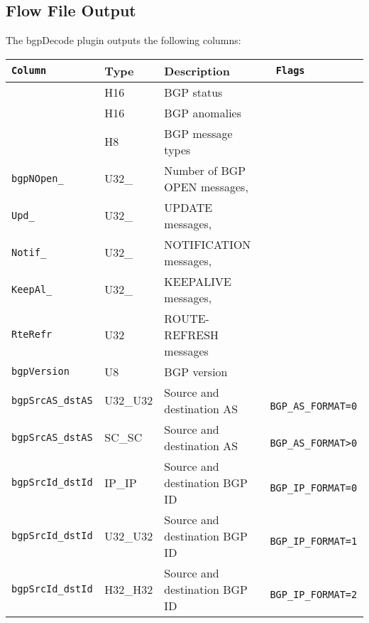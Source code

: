 \documentclass[documentation]{subfiles}
\begin{document}
\subsection{Flow File Output}
The bgpDecode plugin outputs the following columns:
\begin{longtable}{>{\tt}lll>{\tt\small}l}
    \toprule
    {\bf Column}                        & {\bf Type}   & {\bf Description}                             & {\bf Flags}\\
    \midrule\endhead%
    \nameref{bgpStat}                   & H16          & BGP status                                    & \\
    \nameref{bgpAFlgs}                  & H16          & BGP anomalies                                 & \\
    \nameref{bgpMsgT}                   & H8           & BGP message types                             & \\
    bgpNOpen\_                          & U32\_        & Number of BGP OPEN messages,                  & \\
    \qquad Upd\_                        & \qquad U32\_ & \qquad UPDATE messages,                       & \\
    \qquad Notif\_                      & \qquad U32\_ & \qquad NOTIFICATION messages,                 & \\
    \qquad KeepAl\_                     & \qquad U32\_ & \qquad KEEPALIVE messages,                    & \\
    \qquad RteRefr                      & \qquad U32   & \qquad ROUTE-REFRESH messages                 & \\
    bgpVersion                          & U8           & BGP version\\
    bgpSrcAS\_dstAS                     & U32\_U32     & Source and destination AS                     & BGP\_AS\_FORMAT=0\\
    bgpSrcAS\_dstAS                     & SC\_SC       & Source and destination AS                     & BGP\_AS\_FORMAT>0\\
    bgpSrcId\_dstId                     & IP\_IP       & Source and destination BGP ID                 & BGP\_IP\_FORMAT=0\\
    bgpSrcId\_dstId                     & U32\_U32     & Source and destination BGP ID                 & BGP\_IP\_FORMAT=1\\
    bgpSrcId\_dstId                     & H32\_H32     & Source and destination BGP ID                 & BGP\_IP\_FORMAT=2\\

\end{longtable}
\end{document}
